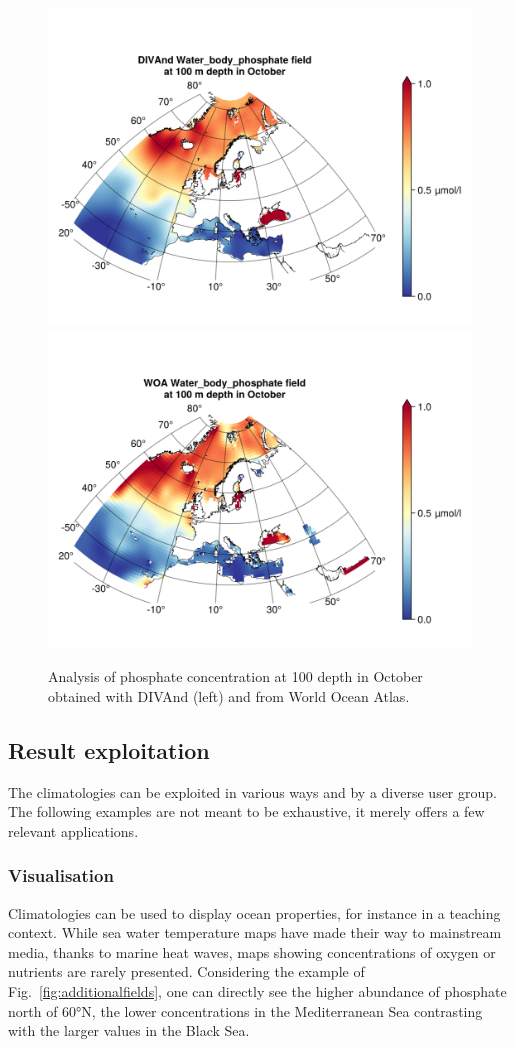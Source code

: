 \documentclass[essd,manuscript]{copernicus}
\begin{document}
\begin{figure}[t]
\includegraphics[width=.49\textwidth]{Water_body_phosphate_depth-100_month-10_DIVAnd}\includegraphics[width=.49\textwidth]{Water_body_phosphate_depth-100_month-10_WOA.png}
\caption{Analysis of phosphate concentration at 100 depth in October obtained with DIVAnd (left) and from World Ocean Atlas.\label{fig:comparisonWOA}}
\end{figure}


\subsection{Result exploitation}

The climatologies can be exploited in various ways and by a diverse user group. The following examples are not meant to be exhaustive, it merely offers a few relevant applications.

\subsubsection{Visualisation}

Climatologies can be used to display ocean properties, for instance in a teaching context. While sea water temperature maps have made their way to mainstream media, thanks to marine heat waves, maps showing concentrations of oxygen or nutrients are rarely presented. Considering the example of Fig.~\ref{fig:additionalfields}, one can directly see the higher abundance of phosphate north of 60°N, the lower concentrations in the Mediterranean Sea contrasting with the larger values in the Black Sea.
\end{document}
